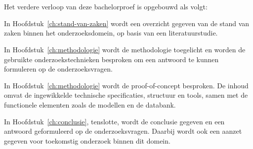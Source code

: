 \section{}%
\label{sec:opzet-bachelorproef}


Het verdere verloop van deze bachelorproef is opgebouwd als volgt:

In Hoofdstuk~\ref{ch:stand-van-zaken} wordt een overzicht gegeven van de stand van zaken binnen het onderzoeksdomein, op basis van een literatuurstudie.

In Hoofdstuk~\ref{ch:methodologie} wordt de methodologie toegelicht en worden de gebruikte onderzoekstechnieken besproken om een antwoord te kunnen formuleren op de onderzoeksvragen.

In Hoofdstuk~\ref{ch:methodologie}  wordt de proof-of-concept besproken. De inhoud omvat de ingewikkelde technische specificaties, structuur en tools, samen met de functionele elementen zoals de modellen en de databank.


In Hoofdstuk~\ref{ch:conclusie}, tenslotte, wordt de conclusie gegeven en een antwoord geformuleerd op de onderzoeksvragen. Daarbij wordt ook een aanzet gegeven voor toekomstig onderzoek binnen dit domein.